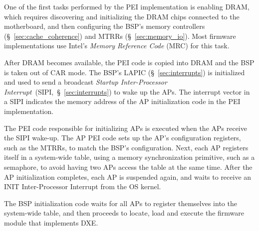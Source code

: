 One of the first tasks performed by the PEI implementation is enabling DRAM,
which requires discovering and initializing the DRAM chips connected to the
motherboard, and then configuring the BSP's memory controllers
(\S~\ref{sec:cache_coherence}) and MTRRs (\S~\ref{sec:memory_io}). Most
firmware implementations use Intel's \textit{Memory Reference Code} (MRC) for
this task.

After DRAM becomes available, the PEI code is copied into DRAM and the BSP is
taken out of CAR mode. The BSP's LAPIC (\S~\ref{sec:interrupts}) is initialized
and used to send a broadcast
\textit{Startup Inter-Processor Interrupt}~(SIPI,~\S~\ref{sec:interrupts})
to wake up the APs. The interrupt vector in a SIPI indicates the memory address
of the AP initialization code in the PEI implementation.


The PEI code responsible for initializing APs is executed when the APs receive
the SIPI wake-up. The AP PEI code sets up the AP's configuration registers,
such as the MTRRs, to match the BSP's configuration. Next, each AP registers
itself in a system-wide table, using a memory synchronization primitive, such
as a semaphore, to avoid having two APs access the table at the same time.
After the AP initialization completes, each AP is suspended again,
and waits to receive an INIT Inter-Processor Interrupt from the OS kernel.

The BSP initialization code waits for all APs to register themselves into the
system-wide table, and then proceeds to locate, load and execute the firmware
module that implements DXE.
